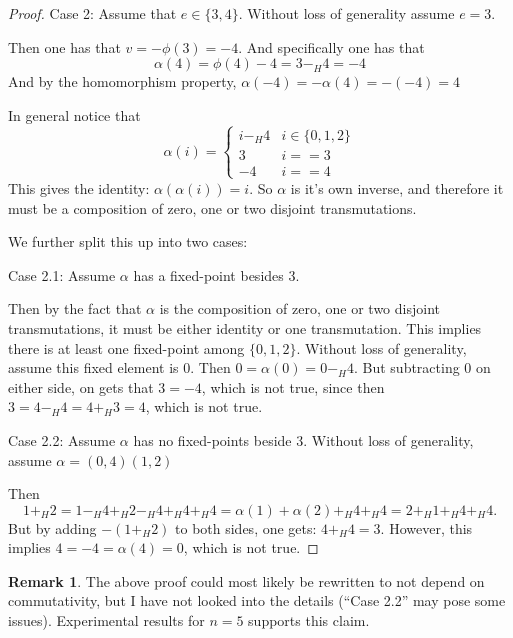 \documentclass[a4paper, 12pt, english]{article}
\theoremstyle{plain}
\theoremstyle{definition}
\newtheorem{remark}[theorem]{Remark}
\begin{document}
\begin{proof}
    Case 2: Assume that \( e \in \{ 3, 4 \} \). Without loss of generality assume \( e = 3 \).

    Then one has that \( v = -\phi(3) = -4 \). And specifically one has that
    \[
        \alpha(4) = \phi(4) - 4 = 3 -_H 4 = - 4
    \]
    And by the homomorphism property, \( \alpha(-4) = -\alpha(4) = -(-4) = 4 \)

    In general notice that
    \[
        \alpha(i) =
        \begin{cases}
            i -_H 4 & i \in \{ 0, 1, 2 \} \\
            3 & i == 3 \\
            -4 & i == 4
        \end{cases}
    \]
    This gives the identity: \( \alpha(\alpha(i)) = i \). So \( \alpha \) is it's own inverse, and therefore it must be a composition of zero, one or two disjoint transmutations.

    We further split this up into two cases:

    Case 2.1: Assume \( \alpha \) has a fixed-point besides \( 3 \).

    Then by the fact that \( \alpha \) is the composition of zero, one or two disjoint transmutations, it must be either identity or one transmutation. This implies there is at least one fixed-point among \( \{ 0, 1, 2 \} \). Without loss of generality, assume this fixed element is \( 0 \). Then \( 0 = \alpha(0) = 0 -_H 4 \). But subtracting \( 0 \) on either side, on gets that \( 3 = -4 \), which is not true, since then \( 3 = 4 -_H 4 = 4 +_H 3 = 4 \), which is not true.

    Case 2.2: Assume \( \alpha \) has no fixed-points beside \( 3 \). Without loss of generality, assume \( \alpha = (0, 4)(1, 2) \)

    Then 
    \[ 
        1 +_H 2 = 1 -_H 4 +_H 2 -_H 4 +_H 4 +_H 4 = \alpha(1) + \alpha(2) +_H 4 +_H 4 = 2 +_H 1 +_H 4 +_H 4.
    \]
    But by adding \( -(1 +_H 2) \) to both sides, one gets: \( 4 +_H 4 = 3\). However, this implies \( 4 = -4 = \alpha(4) = 0 \), which is not true.
\end{proof}

\begin{remark}
    The above proof could most likely be rewritten to not depend on commutativity, but I have not looked into the details (``Case 2.2'' may pose some issues). Experimental results for \( n = 5 \) supports this claim.
\end{remark}
\end{document}
